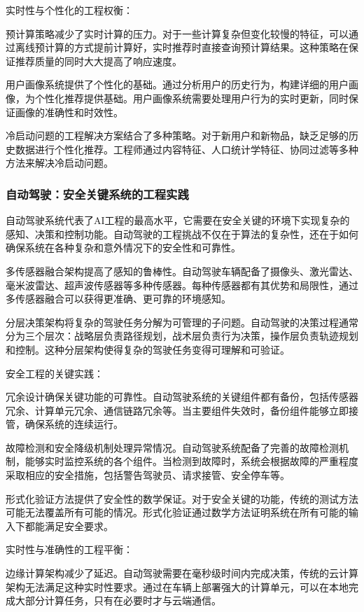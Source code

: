 实时性与个性化的工程权衡：

预计算策略减少了实时计算的压力。对于一些计算复杂但变化较慢的特征，可以通过离线预计算的方式提前计算好，实时推荐时直接查询预计算结果。这种策略在保证推荐质量的同时大大提高了响应速度。

用户画像系统提供了个性化的基础。通过分析用户的历史行为，构建详细的用户画像，为个性化推荐提供基础。用户画像系统需要处理用户行为的实时更新，同时保证画像的准确性和时效性。

冷启动问题的工程解决方案结合了多种策略。对于新用户和新物品，缺乏足够的历史数据进行个性化推荐。工程师通过内容特征、人口统计学特征、协同过滤等多种方法来解决冷启动问题。

\subsubsection{自动驾驶：安全关键系统的工程实践}

自动驾驶系统代表了AI工程的最高水平，它需要在安全关键的环境下实现复杂的感知、决策和控制功能。自动驾驶的工程挑战不仅在于算法的复杂性，还在于如何确保系统在各种复杂和意外情况下的安全性和可靠性。

多传感器融合架构提高了感知的鲁棒性。自动驾驶车辆配备了摄像头、激光雷达、毫米波雷达、超声波传感器等多种传感器。每种传感器都有其优势和局限性，通过多传感器融合可以获得更准确、更可靠的环境感知。

分层决策架构将复杂的驾驶任务分解为可管理的子问题。自动驾驶的决策过程通常分为三个层次：战略层负责路径规划，战术层负责行为决策，操作层负责轨迹规划和控制。这种分层架构使得复杂的驾驶任务变得可理解和可验证。

安全工程的关键实践：

冗余设计确保关键功能的可靠性。自动驾驶系统的关键组件都有备份，包括传感器冗余、计算单元冗余、通信链路冗余等。当主要组件失效时，备份组件能够立即接管，确保系统的连续运行。

故障检测和安全降级机制处理异常情况。自动驾驶系统配备了完善的故障检测机制，能够实时监控系统的各个组件。当检测到故障时，系统会根据故障的严重程度采取相应的安全措施，包括警告驾驶员、请求接管、安全停车等。

形式化验证方法提供了安全性的数学保证。对于安全关键的功能，传统的测试方法可能无法覆盖所有可能的情况。形式化验证通过数学方法证明系统在所有可能的输入下都能满足安全要求。

实时性与准确性的工程平衡：

边缘计算架构减少了延迟。自动驾驶需要在毫秒级时间内完成决策，传统的云计算架构无法满足这种实时性要求。通过在车辆上部署强大的计算单元，可以在本地完成大部分计算任务，只有在必要时才与云端通信。

